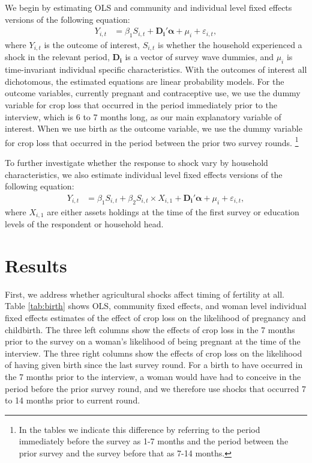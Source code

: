 \documentclass[letterpaper,12pt]{article}
\begin{document}
We begin by estimating OLS and community and individual level fixed effects 
versions of the following equation:
\begin{align}
Y_{i,t} &=  \beta_1 S_{i,t}  +\boldsymbol{D_{i}}'\boldsymbol{\alpha} 
+ \mu_i + \varepsilon_{i,t},   \label{eq:fixed_effects1} 
\end{align}
where $Y_{i,t}$ is the outcome of interest,  
$S_{i,t}$ is whether the household experienced a shock in the relevant period,
$\boldsymbol{D_{i}}$ is a vector of survey wave dummies, 
and $\mu_i$ is time-invariant individual specific characteristics.
With the outcomes of interest all dichotomous, the estimated equations 
are linear probability models. 
For the outcome variables, currently pregnant and contraceptive use, we use 
the dummy variable for crop loss that occurred in the period immediately 
prior to the interview, which is 6 to 7 months long, as our main explanatory 
variable of interest. 
When we use birth as the outcome variable, 
we use the dummy variable for crop loss that occurred in the period between 
the prior two survey rounds.%
\footnote{
In the tables we indicate this difference by referring to the period 
immediately before the survey as 1-7 months and the period between the
prior survey and the survey before that as 7-14 months.
}

To further investigate whether the response to shock vary by household
characteristics, we also estimate individual level fixed effects versions 
of the following equation:
\begin{align}
Y_{i,t} &=  \beta_1 S_{i,t}  +  \beta_2 S_{i,t} \times X_{i,1} +
\boldsymbol{D_{i}}'\boldsymbol{\alpha} + \mu_i + \varepsilon_{i,t},   
\label{eq:fixed_effects2} 
\end{align}
where $X_{i,1}$ are either assets holdings at the time of the first
survey or education levels of the respondent or household head.



\section{Results}


First, we address whether agricultural shocks affect timing of fertility at all.
Table \ref{tab:birth} shows OLS, community fixed effects, and woman level individual 
fixed effects estimates of the effect of crop loss on the likelihood of pregnancy 
and childbirth.
The three left columns show the effects of crop loss in the 7 months prior to the
survey on a woman's likelihood of being pregnant at the time of the interview.
The three right columns show the effects of crop loss on the likelihood of having given 
birth since the last survey round. 
For a birth to have occurred in the 7 months prior to the interview, a woman would have
had to conceive in the period before the prior survey round, and we therefore use shocks
that occurred 7 to 14 months prior to current round.
\end{document}
